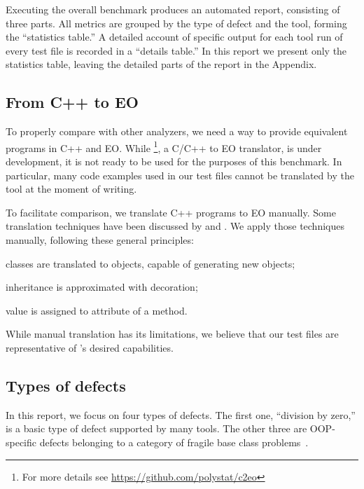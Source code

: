 Executing the overall benchmark produces an automated report, consisting of three parts. All metrics are grouped by the type of defect and the tool, forming the ``statistics table.'' A detailed account of specific output for each tool run of every test file is recorded in a ``details table.'' In this report we present only the statistics table, leaving the detailed parts of the report in the Appendix.


\subsection{From C++ to EO}

To properly compare \polystat{} with other analyzers, we need a way to provide equivalent programs in C++ and EO. While \footnote{For more details see \url{https://github.com/polystat/c2eo}}, a C/C++ to EO translator, is under development, it is not ready to be used for the purposes of this benchmark. In particular, many code examples used in our test files cannot be translated by the tool at the moment of writing.

To facilitate comparison, we translate C++ programs to EO manually. Some translation techniques have been discussed by \citet{bugayenko2021reducing} and \citet[Section 2]{KudasovShilovStepanov2021}. We apply those techniques manually, following these general principles:
\begin{inparaenum}[a)]
    \item classes are translated to objects, capable of generating new objects;
    \item inheritance is approximated with decoration;
    \item {} value is assigned to  attribute of a method.
\end{inparaenum}

While manual translation has its limitations, we believe that our test files are representative of \polystat{}'s desired capabilities.

\subsection{Types of defects}

In this report, we focus on four types of defects. The first one, ``division by zero,'' is a basic type of defect supported by many tools. The other three are OOP-specific defects belonging to a category of fragile base class problems~\citep{MikhajlovSekerinski1998}.

